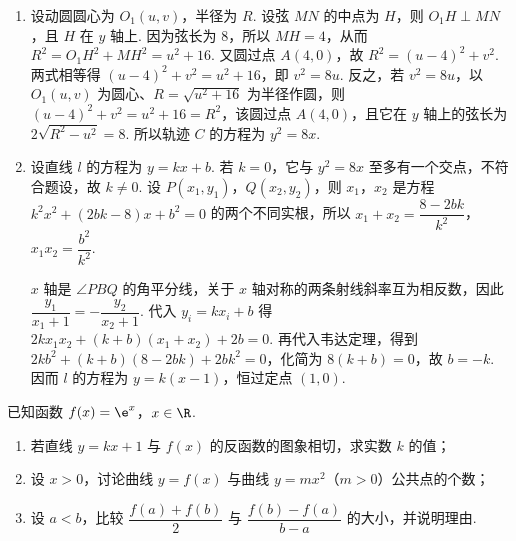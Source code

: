 \begin{solution}
\begin{enumerate}
\item 设动圆圆心为 \(O_1(u,v)\)，半径为 \(R\). 设弦 \(MN\) 的中点为 \(H\)，则 \(O_1H\perp MN\)，且 \(H\) 在 \(y\) 轴上. 因为弦长为 \(8\)，所以 \(MH=4\)，从而 \(R^2=O_1H^2+MH^2=u^2+16\). 又圆过点 \(A(4,0)\)，故 \(R^2=(u-4)^2+v^2\). 两式相等得 \((u-4)^2+v^2=u^2+16\)，即 \(v^2=8u\). 反之，若 \(v^2=8u\)，以 \(O_1(u,v)\) 为圆心、\(R=\sqrt{u^2+16}\) 为半径作圆，则 \((u-4)^2+v^2=u^2+16=R^2\)，该圆过点 \(A(4,0)\)，且它在 \(y\) 轴上的弦长为 \(2\sqrt{R^2-u^2}=8\). 所以轨迹 \(C\) 的方程为 \(y^2=8x\).
\item 设直线 \(l\) 的方程为 \(y=kx+b\). 若 \(k=0\)，它与 \(y^2=8x\) 至多有一个交点，不符合题设，故 \(k\neq0\). 设 \(P(x_1,y_1)\)，\(Q(x_2,y_2)\)，则 \(x_1\)，\(x_2\) 是方程 \(k^2x^2+(2bk-8)x+b^2=0\) 的两个不同实根，所以 \(x_1+x_2=\dfrac{8-2bk}{k^2}\)，\(x_1x_2=\dfrac{b^2}{k^2}\).

\(x\) 轴是 \(\angle PBQ\) 的角平分线，关于 \(x\) 轴对称的两条射线斜率互为相反数，因此 \(\dfrac{y_1}{x_1+1}=-\dfrac{y_2}{x_2+1}\). 代入 \(y_i=kx_i+b\) 得 \(2kx_1x_2+(k+b)(x_1+x_2)+2b=0\). 再代入韦达定理，得到
\(2kb^2+(k+b)(8-2bk)+2bk^2=0\)，化简为 \(8(k+b)=0\)，故 \(b=-k\). 因而 \(l\) 的方程为 \(y=k(x-1)\)，恒过定点 \((1,0)\).
\end{enumerate}
\end{solution}

\begin{problem}
已知函数 \(f(x)=\e^x\)，\(x\in\R\).

\begin{enumerate}
\item 若直线 \(y=kx+1\) 与 \(f(x)\) 的反函数的图象相切，求实数 \(k\) 的值；
\item 设 \(x>0\)，讨论曲线 \(y=f(x)\) 与曲线 \(y=mx^2\)（\(m>0\)）公共点的个数；
\item 设 \(a<b\)，比较 \(\dfrac{f(a)+f(b)}{2}\) 与 \(\dfrac{f(b)-f(a)}{b-a}\) 的大小，并说明理由.
\end{enumerate}
\end{problem}

